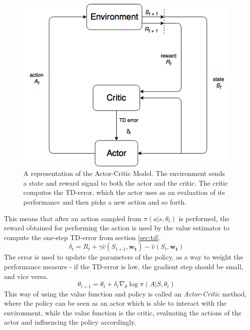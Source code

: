 \documentclass[11pt]{article}
\begin{document}
\begin{figure}[!h]
    \centering
    \includegraphics[scale = 0.5]{include/ActorCriticDiagram.png}
    \caption{A representation of the Actor-Critic Model.
        The environment sends a state and reward signal to both the actor and the critic.
        The critic computes the TD-error, which the actor uses as an evaluation of its performance
        and then picks a new action and so forth.}
    \label{fig:actor-critic}
\end{figure}
\newpage
This means that after an action sampled from $\pi(a|s,\theta_t)$ is performed,
the reward obtained for performing the action is used by the value estimator to
compute the one-step TD-error from section \ref{sec:td}.
\begin{equation*}
    \delta_t =  R_t + \gamma \hat{v} (S_{t+1}, \mathbf{w_t}) - \hat{v}(S_t, \mathbf{w_t})
\end{equation*}
The error is used to update the parameters of the policy,
as a way to weight the performance measure - if the TD-error is low,
the gradient step should be small, and vice versa.
\begin{equation}\label{eq:ac_theta}
    \theta_{t+1} = \theta_t + \delta_t \nabla_{\theta} \log \pi(A | S, \theta_t)
\end{equation}
This way of using the value function and policy is called an
\textit{Actor-Critic} method, where the policy can be seen as an actor
which is able to interact with the environment, while the value function
is the critic, evaluating the actions of the actor and 
influencing the policy accordingly.
\end{document}
